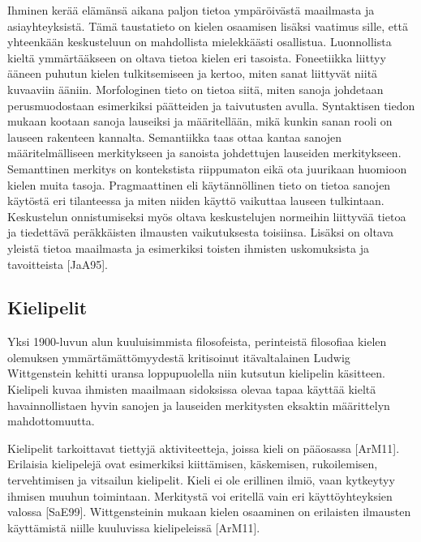 \documentclass[finnish]{tktltiki2}
\theoremstyle{definition}
\theoremstyle{remark}
\begin{document}
Ihminen kerää elämänsä aikana paljon tietoa ympäröivästä maailmasta ja asiayhteyksistä. Tämä taustatieto on kielen osaamisen lisäksi vaatimus sille, että yhteenkään keskusteluun on mahdollista mielekkäästi osallistua. Luonnollista kieltä ymmärtääkseen on oltava tietoa kielen eri tasoista. Foneetiikka liittyy ääneen puhutun kielen tulkitsemiseen ja kertoo, miten sanat liittyvät niitä kuvaaviin ääniin. Morfologinen tieto on tietoa siitä, miten sanoja johdetaan perusmuodostaan esimerkiksi päätteiden ja taivutusten avulla. Syntaktisen tiedon mukaan kootaan sanoja lauseiksi ja määritellään, mikä kunkin sanan rooli on lauseen rakenteen kannalta. Semantiikka taas ottaa kantaa sanojen määritelmälliseen merkitykseen ja sanoista johdettujen lauseiden merkitykseen. Semanttinen merkitys on kontekstista riippumaton eikä ota juurikaan huomioon kielen muita tasoja.  Pragmaattinen eli käytännöllinen tieto on tietoa sanojen käytöstä eri tilanteessa ja miten niiden käyttö vaikuttaa lauseen tulkintaan. Keskustelun onnistumiseksi myös oltava keskustelujen normeihin liittyvää tietoa ja tiedettävä peräkkäisten ilmausten vaikutuksesta toisiinsa. Lisäksi on oltava yleistä tietoa maailmasta ja esimerkiksi toisten ihmisten uskomuksista ja tavoitteista [JaA95]. 

\subsection{Kielipelit}

Yksi 1900-luvun alun kuuluisimmista filosofeista, perinteistä filosofiaa kielen olemuksen ymmärtämättömyydestä kritisoinut itävaltalainen Ludwig Wittgenstein kehitti uransa loppupuolella niin kutsutun kielipelin käsitteen. Kielipeli kuvaa ihmisten maailmaan sidoksissa olevaa tapaa käyttää kieltä havainnollistaen hyvin sanojen ja lauseiden merkitysten eksaktin määrittelyn mahdottomuutta. 
 
Kielipelit tarkoittavat tiettyjä aktiviteetteja, joissa kieli on pääosassa [ArM11]. Erilaisia kielipelejä ovat esimerkiksi kiittämisen, käskemisen, rukoilemisen, tervehtimisen ja vitsailun kielipelit. Kieli ei ole erillinen ilmiö, vaan kytkeytyy ihmisen muuhun toimintaan. Merkitystä voi eritellä vain eri käyttöyhteyksien valossa [SaE99]. Wittgensteinin mukaan kielen osaaminen on erilaisten ilmausten käyttämistä niille kuuluvissa kielipeleissä [ArM11]. 
 
\end{document}
